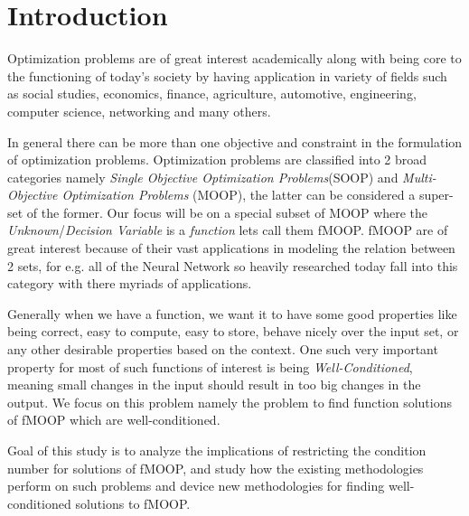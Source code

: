 \chapter{Introduction}

\hspace{1cm}Optimization problems are of great interest academically along with being core to the functioning of today's society by having application in variety of fields such as social studies, economics, finance, agriculture, automotive, engineering, computer science, networking and many others.

In general there can be more than one objective and constraint in the formulation of optimization problems. Optimization problems are classified into 2 broad categories namely \textit{Single Objective Optimization Problems}(SOOP) and \textit{Multi-Objective Optimization Problems} (MOOP), the latter can be considered a super-set of the former. Our focus will be on a special subset of MOOP where the \textit{Unknown}/\textit{Decision Variable} is a \textit{function} lets call them fMOOP. fMOOP are of great interest because of their vast applications in modeling the relation between 2 sets, for e.g. all of the Neural Network so heavily researched today fall into this category with there myriads of applications. 

Generally when we have a function, we want it to have some good properties like being correct, easy to compute, easy to store, behave nicely over the input set, or any other desirable properties based on the context. One such very important property for most of such functions of interest is being \textit{Well-Conditioned}, meaning small changes in the input should result in too big changes in the output. We focus on this problem namely the problem to find function solutions of fMOOP which are well-conditioned.

Goal of this study is to analyze the implications of restricting the condition number for solutions of fMOOP, and study how the existing methodologies perform on such problems and device new methodologies for finding well-conditioned solutions to fMOOP.

